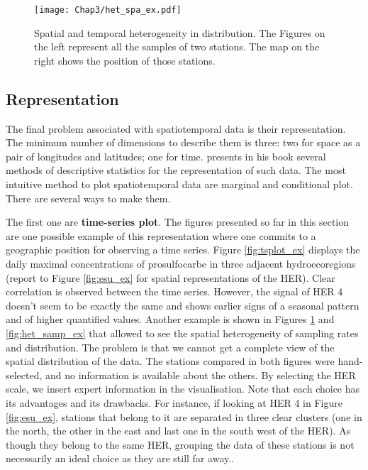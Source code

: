 \begin{figure}[ht]
    \centering
    \texttt{[image: Chap3/het\_spa\_ex.pdf]}
    \caption{Spatial and temporal heterogeneity in distribution. The Figures on the left represent all the samples of two stations. The map on the right shows the position of those stations.}
    \label{fig:het_spa_ex}
\end{figure}

\subsection{Representation}

The final problem associated with spatiotemporal data is their representation. The minimum number of dimensions to describe them is three: two for space as a pair of longitudes and latitudes; one for time. \cite{cressie2015} presents in his book several methods of descriptive statistics for the representation of such data. The most intuitive method to plot spatiotemporal data are marginal and conditional plot. There are several ways to make them.

 The first one are \textbf{time-series plot}. The figures presented so far in this section are one possible example of this representation where one commits to a geographic position for observing a time series. Figure \ref{fig:tsplot_ex} displays the daily maximal concentrations of prosulfocarbe in three adjacent hydroecoregions (report to Figure \ref{fig:esu_ex} for spatial representations of the HER). Clear correlation is observed between the time series. However, the signal of HER 4 doesn't seem to be exactly the same and shows earlier signs of a seasonal pattern and of higher quantified values. Another example is shown in Figures \ref{fig:het_spa_ex} and \ref{fig:het_samp_ex} that allowed to see the spatial heterogeneity of sampling rates and distribution. The problem is that we cannot get a complete view of the spatial distribution of the data. The stations compared in both figures were hand-selected, and no information is available about the others. By selecting the HER scale, we insert expert information in the visualisation. Note that each choice has its advantages and its drawbacks. For instance, if looking at HER 4 in Figure \ref{fig:esu_ex}, stations that belong to it are separated in three clear clusters (one in the north, the other in the east and last one in the south west of the HER). As though they belong to the same HER, grouping the data of these stations is not necessarily an ideal choice as they are still far away.. 
 
